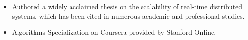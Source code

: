 

\begin{cventries}

  \begin{itemize}
      \item Authored a widely acclaimed thesis on the scalability of real-time distributed systems, which has been cited in numerous academic and professional studies.
      \item Algorithms Specialization on Coursera provided by Stanford Online.
  \end{itemize}


\end{cventries}
